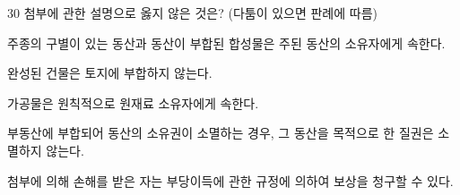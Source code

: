 \begin{question}{30}
첨부에 관한 설명으로 옳지 않은 것은? (다툼이 있으면 판례에 따름)
\begin{choices}
  \item 주종의 구별이 있는 동산과 동산이 부합된 합성물은 주된 동산의 소유자에게 속한다.
  \item 완성된 건물은 토지에 부합하지 않는다.
  \item 가공물은 원칙적으로 원재료 소유자에게 속한다.
  \item 부동산에 부합되어 동산의 소유권이 소멸하는 경우, 그 동산을 목적으로 한 질권은 소멸하지 않는다.
  \item 첨부에 의해 손해를 받은 자는 부당이득에 관한 규정에 의하여 보상을 청구할 수 있다.
\end{choices}
\end{question}
